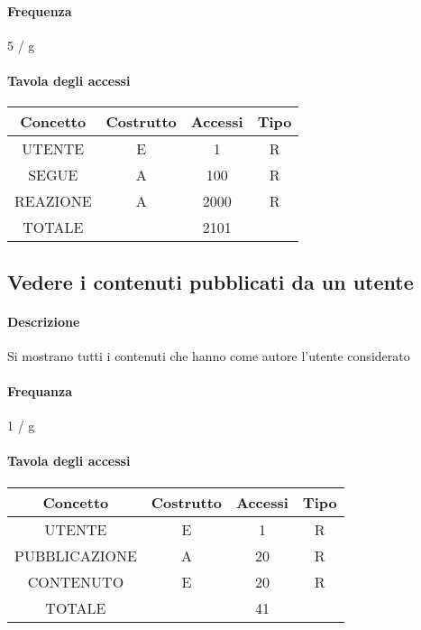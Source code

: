 \documentclass[a4paper,12pt]{report}
\begin{document}
\paragraph{Frequenza} 5 / g
\begin{table}[H]
\paragraph{Tavola degli accessi\newline}
\begin{tabular}{|c|c|c|c|}
\hline
Concetto & Costrutto & Accessi & Tipo \\ \hline
UTENTE   & E         & 1       & R    \\ \hline
SEGUE    & A         & 100     & R    \\ \hline
REAZIONE & A         & 2000    & R    \\ \hline
TOTALE   &           & 2101    &      \\ \hline
\end{tabular}
\end{table}
\subsection{Vedere i contenuti pubblicati da un utente} \label{vedere_post_utente}
\paragraph{Descrizione} Si mostrano tutti i contenuti che hanno come autore l'utente considerato
\paragraph{Frequanza} 1 / g
\begin{table}[H]
\paragraph{Tavola degli accessi\newline}
\begin{tabular}{|c|c|c|c|}
\hline
Concetto      & Costrutto & Accessi & Tipo \\ \hline
UTENTE        & E         & 1       & R    \\ \hline
PUBBLICAZIONE & A         & 20      & R    \\ \hline
CONTENUTO     & E         & 20      & R    \\ \hline
TOTALE        &           & 41      &      \\ \hline
\end{tabular}
\end{table}
\end{document}
